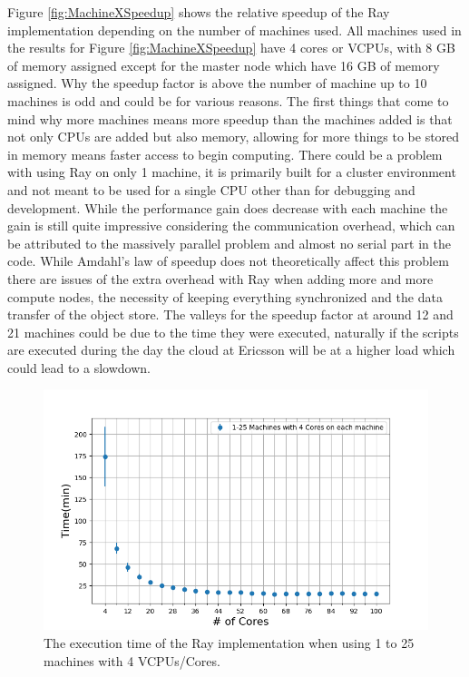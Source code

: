 \documentclass[12pt, a4paper]{article}
\begin{document}
Figure \ref{fig:MachineXSpeedup} shows the relative speedup of the Ray implementation depending on the number of machines used.
All machines used in the results for Figure \ref{fig:MachineXSpeedup} have 4 cores or VCPUs, with 8 GB of memory assigned except for the master node which have 16 GB of memory assigned.
Why the speedup factor is above the number of machine up to 10 machines is odd and could be for various reasons.
The first things that come to mind why more machines means more speedup than the machines added is that not only CPUs are added but also memory, allowing for more things to be stored in memory means faster access to begin computing.
There could be a problem with using Ray on only 1 machine, it is primarily built for a cluster environment and not meant to be used for a single CPU other than for debugging and development.
While the performance gain does decrease with each machine the gain is still quite impressive considering the communication overhead, which can be attributed to the massively parallel problem and almost no serial part in the code.
While Amdahl's law of speedup does not theoretically affect this problem there are issues of the extra overhead with Ray when adding more and more compute nodes, the necessity of keeping everything synchronized and the data transfer of the object store.
The valleys for the speedup factor at around 12 and 21 machines could be due to the time they were executed, naturally if the scripts are executed during the day the cloud at Ericsson will be at a higher load which could lead to a slowdown.

\begin{figure}[H]
    \centering
    \includegraphics[width=1.0\textwidth, ]{pictures/CoresXTimeMinutesWhite.png}
    \caption{The execution time of the Ray implementation when using 1 to 25 machines with 4 VCPUs/Cores.}
    \label{fig:CoresXTime}
\end{figure}
\end{document}
